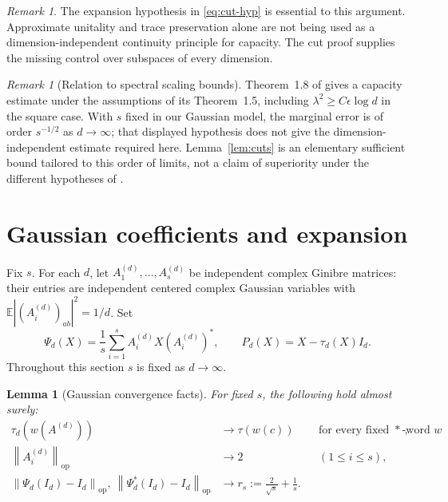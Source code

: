 \documentclass[11pt]{article}
\newtheorem{lemma}[theorem]{Lemma}
\theoremstyle{remark}
\newtheorem{remark}[theorem]{Remark}
\newcommand{\E}{\mathbb E}
\newcommand{\op}{\mathrm{op}}
\newcommand{\norm}[1]{\left\lVert#1\right\rVert}
\newcommand{\abs}[1]{\left\lvert#1\right\rvert}
\begin{document}
\begin{remark}
The expansion hypothesis in \eqref{eq:cut-hyp} is essential
to this argument. Approximate unitality and trace preservation
alone are not being used as a dimension-independent continuity
principle for capacity. The cut proof supplies the missing control
over subspaces of every dimension.
\end{remark}

\begin{remark}[Relation to spectral scaling bounds]
Theorem~1.8 of \cite{KLR} gives a capacity estimate under the
assumptions of its Theorem~1.5, including
$\lambda^2\geq C\epsilon\log d$ in the square case.
With $s$ fixed in our Gaussian model, the marginal error is of
order $s^{-1/2}$ as $d\to\infty$; that displayed hypothesis
does not give the dimension-independent estimate required here.
Lemma~\ref{lem:cuts} is an elementary sufficient bound tailored
to this order of limits, not a claim of superiority under the
different hypotheses of \cite{KLR}.
\end{remark}

\section{Gaussian coefficients and expansion}
\label{sec:gaussian}

Fix $s$. For each $d$, let $A_1^{(d)},\ldots,A_s^{(d)}$ be independent
complex Ginibre matrices: their entries are independent centered
complex Gaussian variables with
$\E\abs{(A_i^{(d)})_{ab}}^2=1/d$.
Set
\begin{equation}
 \Psi_d(X)=\frac1s\sum_{i=1}^s A_i^{(d)}X(A_i^{(d)})^*,
 \qquad
 P_d(X)=X-\tau_d(X)I_d. \label{eq:Psi}
\end{equation}
Throughout this section $s$ is fixed as $d\to\infty$.

\begin{lemma}[Gaussian convergence facts]\label{lem:gaussian-basic}
For fixed $s$, the following hold almost surely:
\begin{align}
 \tau_d(w(A^{(d)}))&\longrightarrow\tau(w(c))
                      &&\text{for every fixed $*$-word $w$}, \label{eq:g-mom}\\
 \norm{A_i^{(d)}}_{\op}&\longrightarrow2
                      &&(1\leq i\leq s), \label{eq:g-norm}\\
 \norm{\Psi_d(I_d)-I_d}_{\op},
 \ \norm{\Psi_d^*(I_d)-I_d}_{\op}
       &\longrightarrow r_s:=\frac2{\sqrt{s}}+\frac1s .
                      \label{eq:g-margin}
\end{align}
\end{lemma}
\end{document}
